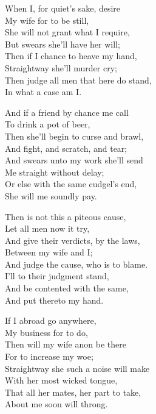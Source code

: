 \begin{dcverse}
\begin{altverse}
When I, for quiet’s sake, desire\\
My wife for to be still,\\
She will not grant what I require,\\
But swears she’ll have her will;\\
Then if I chance to heave my hand,\\
Straightway she’ll murder cry;\\
Then judge all men that here do stand,\\
In what a case am I.
\end{altverse}

\begin{altverse}
And if a friend by chance me call\\
To drink a pot of beer,\\
Then she’ll begin to curse and brawl,\\
And fight, and scratch, and tear;\\
And swears unto my work she’ll send\\
Me straight without delay;\\
Or else with the same cudgel’s end,\\
She will me soundly pay.
\end{altverse}

\begin{altverse}
Then is not this a piteous cause,\\
Let all men now it try,\\
And give their verdicts, by the laws,\\
Between my wife and I;\\
And judge the cause, who is to blame.\\
I’ll to their judgment stand,\\
And be contented with the same,\\
And put thereto my hand.
\end{altverse}

\begin{altverse}
If I abroad go anywhere,\\
My business for to do,\\
Then will my wife anon be there\\
For to increase my woe;\\
Straightway she such a noise will make\\
With her most wicked tongue,\\
That all her mates, her part to take,\\
About me soon will throng.
\end{altverse}


\end{dcverse}

